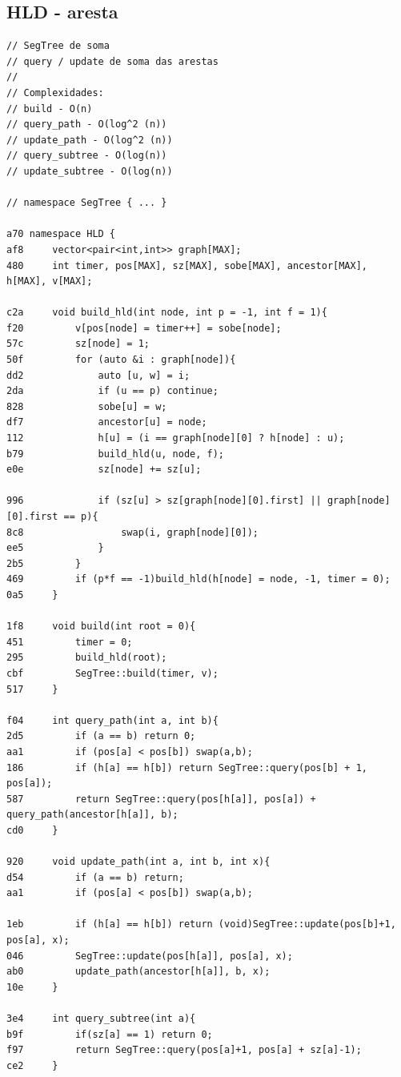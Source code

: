 \documentclass[11pt, a4paper, twoside]{article}
\begin{document}
{\subsection{HLD - aresta}
\begin{lstlisting}
// SegTree de soma
// query / update de soma das arestas
//
// Complexidades:
// build - O(n)
// query_path - O(log^2 (n))
// update_path - O(log^2 (n))
// query_subtree - O(log(n))
// update_subtree - O(log(n))

// namespace SegTree { ... }

a70 namespace HLD {
af8     vector<pair<int,int>> graph[MAX];
480     int timer, pos[MAX], sz[MAX], sobe[MAX], ancestor[MAX], h[MAX], v[MAX]; 
    
c2a     void build_hld(int node, int p = -1, int f = 1){
f20         v[pos[node] = timer++] = sobe[node];
57c         sz[node] = 1;
50f         for (auto &i : graph[node]){
dd2             auto [u, w] = i;
2da             if (u == p) continue;
828             sobe[u] = w;
df7             ancestor[u] = node;
112             h[u] = (i == graph[node][0] ? h[node] : u); 
b79             build_hld(u, node, f);
e0e             sz[node] += sz[u];
    
996             if (sz[u] > sz[graph[node][0].first] || graph[node][0].first == p){
8c8                 swap(i, graph[node][0]);
ee5             }
2b5         }
469         if (p*f == -1)build_hld(h[node] = node, -1, timer = 0);
0a5     }
    
1f8     void build(int root = 0){
451         timer = 0;
295         build_hld(root);
cbf         SegTree::build(timer, v);
517     }
    
f04     int query_path(int a, int b){
2d5         if (a == b) return 0;
aa1         if (pos[a] < pos[b]) swap(a,b);
186         if (h[a] == h[b]) return SegTree::query(pos[b] + 1, pos[a]);
587         return SegTree::query(pos[h[a]], pos[a]) + query_path(ancestor[h[a]], b);
cd0     }
    
920     void update_path(int a, int b, int x){
d54         if (a == b) return;
aa1         if (pos[a] < pos[b]) swap(a,b);
    
1eb         if (h[a] == h[b]) return (void)SegTree::update(pos[b]+1, pos[a], x);
046         SegTree::update(pos[h[a]], pos[a], x);
ab0         update_path(ancestor[h[a]], b, x);
10e     }
    
3e4     int query_subtree(int a){
b9f         if(sz[a] == 1) return 0;
f97         return SegTree::query(pos[a]+1, pos[a] + sz[a]-1);
ce2     }
    

\end{lstlisting}}
\end{document}
